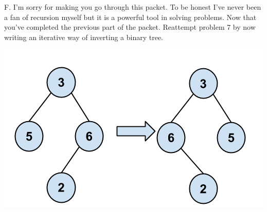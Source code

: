 \documentclass[12pt]{article}
\begin{document}
\newpage
\noindent F. I'm sorry for making you go through this packet. To be honest I've never been a fan of recursion myself but it is a powerful tool in solving problems. Now that you've completed the previous part of the packet. Reattempt problem 7 by now writing an iterative way of inverting a binary tree.
\centerline{\includegraphics[scale = 0.4]{invertbtree.png}}
\end{document}
